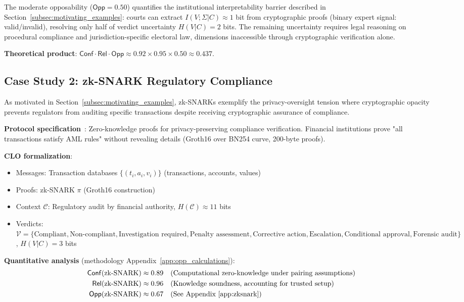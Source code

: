 \documentclass{ieeeaccess}
\begin{document}
The moderate opposability ($\mathsf{Opp} = 0.50$) quantifies the institutional interpretability barrier described in Section~\ref{subsec:motivating_examples}: courts can extract $I(V;\Sigma|C) \approx 1$ bit from cryptographic proofs (binary expert signal: valid/invalid), resolving only half of verdict uncertainty $H(V|C) = 2$ bits. The remaining uncertainty requires legal reasoning on procedural compliance and jurisdiction-specific electoral law, dimensions inaccessible through cryptographic verification alone.

\textbf{Theoretical product}: $\mathsf{Conf} \cdot \mathsf{Rel} \cdot \mathsf{Opp} \approx 0.92 \times 0.95 \times 0.50 \approx 0.437$.

\subsection{Case Study 2: zk-SNARK Regulatory Compliance}

As motivated in Section~\ref{subsec:motivating_examples}, zk-SNARKs exemplify the privacy-oversight tension where cryptographic opacity prevents regulators from auditing specific transactions despite receiving cryptographic assurance of compliance.

\textbf{Protocol specification}~\cite{Groth16}: Zero-knowledge proofs for privacy-preserving compliance verification. Financial institutions prove "all transactions satisfy AML rules" without revealing details (Groth16 over BN254 curve, 200-byte proofs).

\textbf{CLO formalization}:
\begin{itemize}
\item Messages: Transaction databases $\{(t_i, a_i, v_i)\}$ (transactions, accounts, values)
\item Proofs: zk-SNARK $\pi$ (Groth16 construction)
\item Context $\mathcal{C}$: Regulatory audit by financial authority, $H(\mathcal{C}) \approx 11$ bits
\item Verdicts: $\mathcal{V} = \{\text{Compliant}, \text{Non-compliant}, \text{Investigation required}, \text{Penalty assessment}, \text{Corrective action}, \text{Escalation}, \text{Conditional approval}, \text{Forensic audit}\}$, $H(V|C) = 3$ bits
\end{itemize}

\textbf{Quantitative analysis} (methodology Appendix~\ref{app:opp_calculations}):
\begin{align}
\mathsf{Conf}(\text{zk-SNARK}) &\approx 0.89 \quad \text{(Computational zero-knowledge under pairing assumptions)} \\
\mathsf{Rel}(\text{zk-SNARK}) &\approx 0.96 \quad \text{(Knowledge soundness, accounting for trusted setup)} \\
\mathsf{Opp}(\text{zk-SNARK}) &\approx 0.67 \quad \text{(See Appendix~\ref{app:zksnark})}
\end{align}
\end{document}
